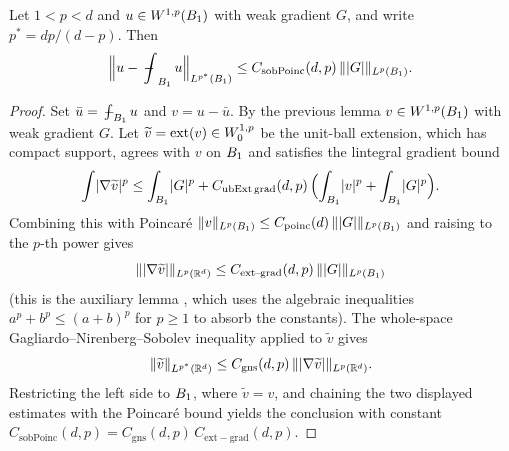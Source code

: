 \begin{theorem}
\label{thm:sobolev_poincare_unitBall}
\leanok
{}
Let $1 < p < d$ and $u \in W^{1,p}(B_{1})$ with weak gradient $G$, and write
$p^{*} = dp/(d-p)$. Then
\begin{equation*}
\Bigl\lVert u - \fint_{\Bz{1}} u \Bigr\rVert_{\Lp{p^{*}}(\Bz{1})}
\le C_{\mathrm{sobPoinc}}(d,p)\, \lVert\lvert G\rvert\rVert_{\Lp{p}(\Bz{1})}.
\end{equation*}
\end{theorem}
\begin{proof}
\leanok
{}

Set $\bar u = \fint_{\Bz{1}} u$ and $v = u - \bar u$. By the previous lemma
$v \in W^{1,p}(B_{1})$ with weak gradient $G$. Let
$\widetilde v = \mathrm{ext}(v) \in W_0^{1,p}$ be the unit-ball extension, which has
compact support, agrees with $v$ on $B_{1}$ and satisfies the lintegral gradient bound
\begin{equation*}
\int \lvert \nabla \widetilde v\rvert^{p}
\le \int_{B_{1}} \lvert G\rvert^{p}
+ C_{\mathrm{ubExt\,grad}}(d,p)\,
\Bigl(\int_{B_{1}} \lvert v\rvert^{p} + \int_{B_{1}} \lvert G\rvert^{p}\Bigr).
\end{equation*}
Combining this with Poincar\'e
$\lVert v\rVert_{L^{p}(B_{1})} \le C_{\mathrm{poinc}}(d)\,\lVert\lvert G\rvert\rVert_{L^{p}(B_{1})}$
and raising to the $p$-th power gives
\begin{equation*}
\lVert \lvert \nabla \widetilde v\rvert\rVert_{L^{p}(\mathbb{R}^{d})}
\le C_{\mathrm{ext\!-\!grad}}(d,p)\,\lVert\lvert G\rvert\rVert_{L^{p}(B_{1})}
\end{equation*}
(this is the auxiliary lemma , which uses
the algebraic inequalities $a^{p}+b^{p} \le (a+b)^{p}$ for $p\ge 1$ to absorb the
constants). The whole-space Gagliardo--Nirenberg--Sobolev inequality applied to
$\widetilde v$ gives
\begin{equation*}
\lVert \widetilde v\rVert_{L^{p^{*}}(\mathbb{R}^{d})}
\le C_{\mathrm{gns}}(d,p)\,
\lVert \lvert\nabla \widetilde v\rvert\rVert_{L^{p}(\mathbb{R}^{d})}.
\end{equation*}
Restricting the left side to $B_{1}$, where $\widetilde v = v$, and chaining the two
displayed estimates with the Poincar\'e bound yields the conclusion with constant
$C_{\mathrm{sobPoinc}}(d,p) = C_{\mathrm{gns}}(d,p)\,C_{\mathrm{ext\!-\!grad}}(d,p)$.
\end{proof}

